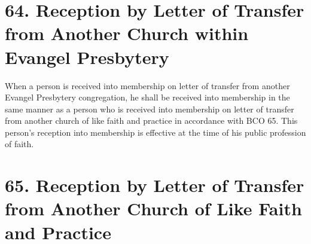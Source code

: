 \documentclass[
]{book}
\begin{document}
\hypertarget{reception-by-letter-of-transfer-from-another-church-within-evangel-presbytery}{%
\section*{64. Reception by Letter of Transfer from Another Church within Evangel Presbytery}\label{reception-by-letter-of-transfer-from-another-church-within-evangel-presbytery}}

\protect\hypertarget{chapter-slug-64-reception-by-letter-of-transfer-from-another-church-within-evangel-presbytery}{\href{}{}}

\protect\hypertarget{64}{\href{}{}}When a person is received into membership on letter of transfer from another Evangel Presbytery congregation, he shall be received into membership in the same manner as a person who is received into membership on letter of transfer from another church of like faith and practice in accordance with BCO 65. This person's reception into membership is effective at the time of his public profession of faith.

\hypertarget{reception-by-letter-of-transfer-from-another-church-of-like-faith-and-practice}{%
\section*{65. Reception by Letter of Transfer from Another Church of Like Faith and Practice}\label{reception-by-letter-of-transfer-from-another-church-of-like-faith-and-practice}}

\protect\hypertarget{chapter-slug-65-reception-by-letter-of-transfer-from-another-church-of-like-faith-and-practice}{\href{}{}}
\end{document}
